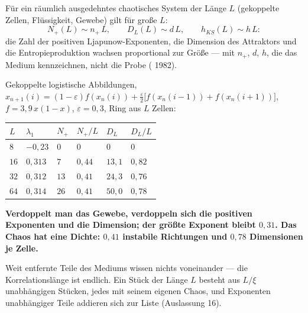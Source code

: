 \begin{merksatz}
Für ein räumlich ausgedehntes chaotisches System der Länge $L$ (gekoppelte Zellen, Flüssigkeit, Gewebe) gilt für große $L$:
\[ N_{+}(L)\sim n_{+}\,L, \qquad D_{L}(L)\sim d\,L, \qquad h_{KS}(L)\sim h\,L : \]
die Zahl der positiven Ljapunow-Exponenten, die Dimension des Attraktors und die Entropieproduktion wachsen proportional zur Größe --- mit  $n_{+}$, $d$, $h$, die das Medium kennzeichnen, nicht die Probe ( 1982).

Gekoppelte logistische Abbildungen, $x_{n+1}(i) = (1-\varepsilon)f(x_n(i)) + \tfrac\varepsilon2\bigl[f(x_n(i-1)) + f(x_n(i+1))\bigr]$, $f = 3{,}9\,x(1-x)$, $\varepsilon = 0{,}3$, Ring aus $L$ Zellen:

\begin{center}
{\small
\renewcommand{\arraystretch}{1.46}
\begin{tabular}{@{}P{1.0cm}P{1.4cm}P{1.6cm}P{1.6cm}P{1.6cm}P{1.6cm}@{}}
\toprule
$L$ & $\lambda_1$ & $N_{+}$ & $N_{+}/L$ & $D_{L}$ & $D_{L}/L$\\
\midrule
$8$ & $-0{,}23$ & $0$ & $0$ & $0$ & $0$\\
$16$ & $0{,}313$ & $7$ & $0{,}44$ & $13{,}1$ & $0{,}82$\\
$32$ & $0{,}312$ & $13$ & $0{,}41$ & $24{,}3$ & $0{,}76$\\
$64$ & $0{,}314$ & $26$ & $0{,}41$ & $50{,}0$ & $0{,}78$\\
\bottomrule
\end{tabular}}
\end{center}

\begin{center}
\begin{minipage}{0.9\textwidth}
\textbf{Verdoppelt man das Gewebe, verdoppeln sich die positiven Exponenten und die Dimension; der größte Exponent bleibt $0{,}31$. Das Chaos hat eine Dichte: $0{,}41$ instabile Richtungen und $0{,}78$ Dimensionen je Zelle.}
\end{minipage}
\end{center}

Weit entfernte Teile des Mediums wissen nichts voneinander --- die Korrelationslänge ist endlich. Ein Stück der Länge $L$ besteht aus $L/\xi$ unabhängigen Stücken, jedes mit seinem eigenen Chaos, und Exponenten unabhängiger Teile addieren sich zur Liste (Auslassung 16).


\end{merksatz}
